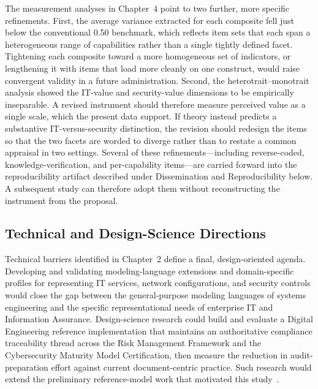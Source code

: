 The measurement analyses in Chapter~4 point to two further, more specific refinements. First, the average variance extracted for each composite fell just below the conventional 0.50 benchmark, which reflects item sets that each span a heterogeneous range of capabilities rather than a single tightly defined facet. Tightening each composite toward a more homogeneous set of indicators, or lengthening it with items that load more cleanly on one construct, would raise convergent validity in a future administration. Second, the heterotrait--monotrait analysis showed the IT-value and security-value dimensions to be empirically inseparable. A revised instrument should therefore measure perceived value as a single scale, which the present data support. If theory instead predicts a substantive IT-versus-security distinction, the revision should redesign the items so that the two facets are worded to diverge rather than to restate a common appraisal in two settings. Several of these refinements---including reverse-coded, knowledge-verification, and per-capability items---are carried forward into the reproducibility artifact described under Dissemination and Reproducibility below. A subsequent study can therefore adopt them without reconstructing the instrument from the proposal.

\subsection{Technical and Design-Science Directions}

Technical barriers identified in Chapter~2 define a final, design-oriented agenda. Developing and validating modeling-language extensions and domain-specific profiles for representing IT services, network configurations, and security controls would close the gap between the general-purpose modeling languages of systems engineering and the specific representational needs of enterprise IT and Information Assurance. Design-science research could build and evaluate a Digital Engineering reference implementation that maintains an authoritative compliance traceability thread across the Risk Management Framework and the Cybersecurity Maturity Model Certification, then measure the reduction in audit-preparation effort against current document-centric practice. Such research would extend the preliminary reference-model work that motivated this study~\parencite{Bonar_Hastings_2024, CMU_SEI_DevSecOps_2023}.

